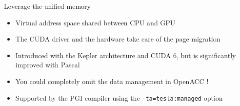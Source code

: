 \documentclass[12pt,aspectratio=169]{beamer}
\newcommand\shinline[2][]{\lstinline[style=shstyle,basicstyle=\ttfamily,#1]!#2!}
\begin{document}



\begin{frame}[fragile]{Leverage the unified memory}
  \begin{itemize}
  \item Virtual address space shared between CPU and GPU
  \item The CUDA driver and the hardware take care of the page migration
  \item Introduced with the Kepler architecture and CUDA 6, but is significantly improved with Pascal
    \pause\vfill
  \item You could completely omit the data management in OpenACC !
  \item Supported by the PGI compiler using the \shinline{-ta=tesla:managed} option
  \end{itemize}
\end{frame}
\end{document}
